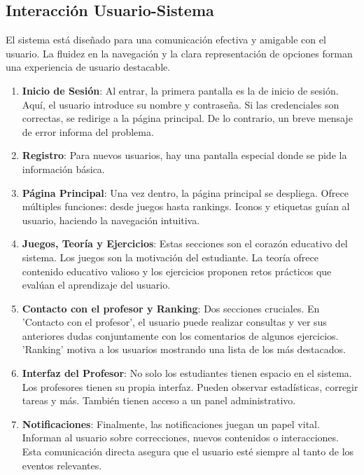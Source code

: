 \subsection{Interacción Usuario-Sistema}

El sistema está diseñado para una comunicación efectiva y amigable con el usuario. La fluidez en la navegación y la clara representación de opciones forman una experiencia de usuario destacable.

\begin{enumerate}
    \item \textbf{Inicio de Sesión}: Al entrar, la primera pantalla es la de inicio de sesión. Aquí, el usuario introduce su nombre y contraseña. Si las credenciales son correctas, se redirige a la página principal. De lo contrario, un breve mensaje de error informa del problema.
    
    \item \textbf{Registro}: Para nuevos usuarios, hay una pantalla especial donde se pide la información básica.
    
    \item \textbf{Página Principal}: Una vez dentro, la página principal se despliega. Ofrece múltiples funciones: desde juegos hasta rankings. Iconos y etiquetas guían al usuario, haciendo la navegación intuitiva.
    
    \item \textbf{Juegos, Teoría y Ejercicios}: Estas secciones son el corazón educativo del sistema. Los juegos son la motivación del estudiante. La teoría ofrece contenido educativo valioso y los ejercicios proponen retos prácticos que evalúan el aprendizaje del usuario.
    
    \item \textbf{Contacto con el profesor y Ranking}: Dos secciones cruciales. En 'Contacto con el profesor', el usuario puede realizar consultas y ver sus anteriores dudas conjuntamente con los comentarios de algunos ejercicios. 'Ranking' motiva a los usuarios mostrando una lista de los más destacados.
    
    \item \textbf{Interfaz del Profesor}: No solo los estudiantes tienen espacio en el sistema. Los profesores tienen su propia interfaz. Pueden observar estadísticas, corregir tareas y más. También tienen acceso a un panel administrativo.
    
    \item \textbf{Notificaciones}: Finalmente, las notificaciones juegan un papel vital. Informan al usuario sobre correcciones, nuevos contenidos o interacciones. Esta comunicación directa asegura que el usuario esté siempre al tanto de los eventos relevantes.
\end{enumerate}

